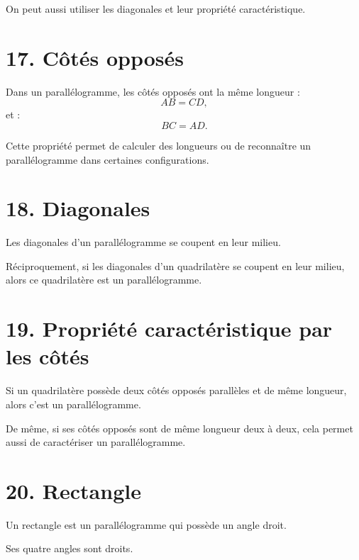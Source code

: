 On peut aussi utiliser les diagonales et leur propriété caractéristique.

\section{17. Côtés opposés}

Dans un parallélogramme, les côtés opposés ont la même longueur :
\[
AB=CD,
\]
et :
\[
BC=AD.
\]

Cette propriété permet de calculer des longueurs ou de reconnaître un parallélogramme dans certaines configurations.

\section{18. Diagonales}


\begin{propriete}
Les diagonales d'un parallélogramme se coupent en leur milieu.
\end{propriete}

Réciproquement, si les diagonales d'un quadrilatère se coupent en leur milieu, alors ce quadrilatère est un parallélogramme.

\section{19. Propriété caractéristique par les côtés}

Si un quadrilatère possède deux côtés opposés parallèles et de même longueur, alors c'est un parallélogramme.

De même, si ses côtés opposés sont de même longueur deux à deux, cela permet aussi de caractériser un parallélogramme.

\section{20. Rectangle}

\begin{definition}
Un rectangle est un parallélogramme qui possède un angle droit.
\end{definition}

Ses quatre angles sont droits.

